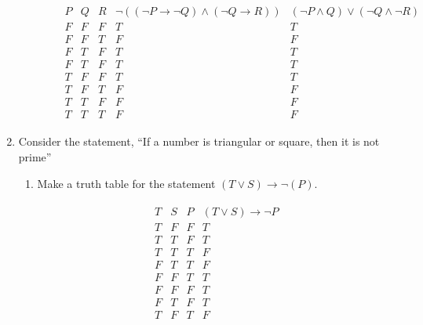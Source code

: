 \documentclass[11pt,a4paper]{article}
\begin{document}
\begin{enumerate}
\begin{enumerate}
\begin{enumerate}
                        \begin{align*}
                            \begin{array}{|c|c|c|c|c|}
                                P & Q & R & \neg((\neg P\rightarrow\neg Q) \land (\neg Q\rightarrow R)) & (\neg P\land Q)\lor(\neg Q\land\neg R)\\
                            \hline
                                F & F & F & T & T\\
                                F & F & T & F & F\\
                                F & T & F & T & T\\
                                F & T & F & T & T\\
                                T & F & F & T & T\\
                                T & F & T & F & F\\
                                T & T & F & F & F\\
                                T & T & T & F & F
                            \end{array}
                        \end{align*}

            \end{enumerate}

        \end{enumerate}

        \item Consider the statement, “If a number is triangular or square, then it is not prime”
            \begin{enumerate}
                \item Make a truth table for the statement $(T\lor S)\rightarrow\neg(P)$.

                \begin{align*}
                    \begin{array}{|c|c|c|c|}
                        T & S & P & (T\lor S)\rightarrow \neg P\\
                    \hline
                    T & F & F & T\\
                    T & T & F & T\\
                    T & T & T & F\\
                    F & T & T & F\\
                    F & F & T & T\\
                    F & F & F & T\\
                    F & T & F & T\\
                    T & F & T & F\\
                    \end{array}
                \end{align*}


\end{enumerate}
\end{enumerate}
\end{document}
